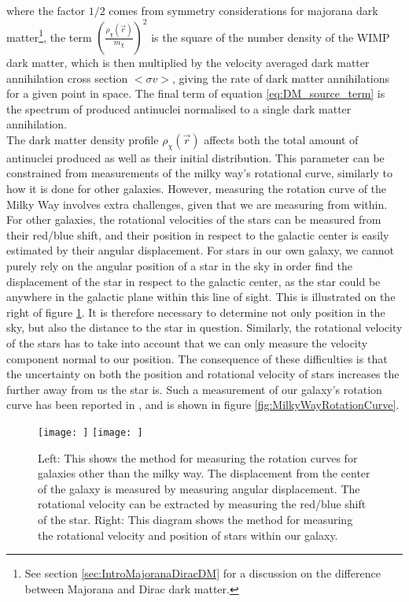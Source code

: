 where the factor $1/2$ comes from symmetry considerations for majorana dark matter\footnote{See section \ref{sec:IntroMajoranaDiracDM} for a discussion on the difference between Majorana and Dirac dark matter.}, the term $\left( \frac{\rho_{\chi}(\vec{r})}{m_\chi}\right)^2$ is the square of the number density of the WIMP dark matter, which is then multiplied by the velocity averaged dark matter annihilation cross section $<\sigma v>$, giving the rate of dark matter annihilations for a given point in space. The final term of equation \ref{eq:DM_source_term} is the spectrum of produced antinuclei normalised to a single dark matter annihilation. \\

The dark matter density profile $\rho_\chi(\vec{r})$ affects both the total amount of antinuclei produced as well as their initial distribution. This parameter can be constrained from measurements of the milky way's rotational curve, similarly to how it is done for other galaxies. However, measuring the rotation curve of the Milky Way involves extra challenges, given that we are measuring from within. For other galaxies, the rotational velocities of the stars can be measured from their red/blue shift, and their position in respect to the galactic center is easily estimated by their angular displacement. For stars in our own galaxy, we cannot purely rely on the angular position of a star in the sky in order find the displacement of the star in respect to the galactic center, as the star could be anywhere in the galactic plane within this line of sight. This is illustrated on the right of figure \ref{fig:measuringDarkMatterProfiles}. It is therefore necessary to determine not only position in the sky, but also the distance to the star in question. Similarly, the rotational velocity of the stars has to take into account that we can only measure the velocity component normal to our position. The consequence of these difficulties is that the uncertainty on both the position and rotational velocity of stars increases the further away from us the star is. Such a measurement of our galaxy's rotation curve has been reported in \cite{}, and is shown in figure \ref{fig:MilkyWayRotationCurve}. \\

\begin{figure}[h]
    \centering
    \texttt{[image: ]}
    \texttt{[image: ]}
    \caption{Left: This shows the method for measuring the rotation curves for galaxies other than the milky way. The displacement from the center of the galaxy is measured by measuring angular displacement. The rotational velocity can be extracted by measuring the red/blue shift of the star\cite{}. Right: This diagram shows the method for measuring the rotational velocity and position of stars within our galaxy.}
    \label{fig:measuringDarkMatterProfiles}
\end{figure}

